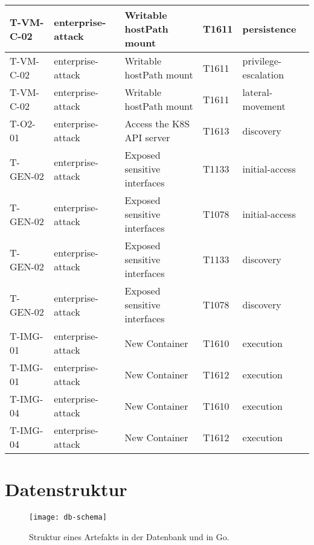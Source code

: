 \begin{longtable}{|l|l|l|l|l|}
    T-VM-C-02 & enterprise-attack & Writable hostPath mount & T1611 & persistence \\ \hline
    T-VM-C-02 & enterprise-attack & Writable hostPath mount & T1611 & privilege-escalation \\ \hline
    T-VM-C-02 & enterprise-attack & Writable hostPath mount & T1611 & lateral-movement \\ \hline
    T-O2-01 & enterprise-attack & Access the K8S API server & T1613 & discovery \\ \hline
    T-GEN-02 & enterprise-attack & Exposed sensitive interfaces & T1133 & initial-access \\ \hline
    T-GEN-02 & enterprise-attack & Exposed sensitive interfaces & T1078 & initial-access \\ \hline
    T-GEN-02 & enterprise-attack & Exposed sensitive interfaces & T1133 & discovery \\ \hline
    T-GEN-02 & enterprise-attack & Exposed sensitive interfaces & T1078 & discovery \\ \hline
    T-IMG-01 & enterprise-attack & New Container & T1610 & execution \\ \hline
    T-IMG-01 & enterprise-attack & New Container & T1612 & execution \\ \hline
    T-IMG-04 & enterprise-attack & New Container & T1610 & execution \\ \hline
    T-IMG-04 & enterprise-attack & New Container & T1612 & execution \\ \hline
\end{longtable}
\restoregeometry

\chapter{Datenstruktur}
\label{app:db-schema}

\begin{figure}[H]
    \centering
    \texttt{[image: db-schema]}
    \caption{Struktur eines Artefakts in der Datenbank und in Go.}
\end{figure}



